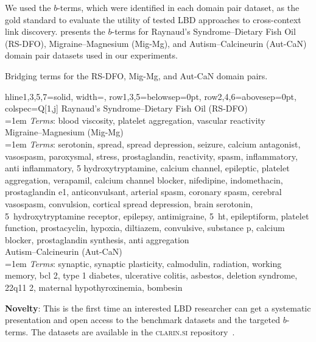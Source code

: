 \documentclass[runningheads]{llncs}
\begin{document}
We used the $b$-terms, which were identified in each domain pair dataset, as the gold standard to evaluate the utility of tested LBD approaches to cross-context link discovery.  presents the $b$-terms for Raynaud's Syndrome--Dietary Fish Oil (RS-DFO), Migraine--Magnesium (Mig-Mg), and Autism--Calcineurin (Aut-CaN) domain pair datasets used in our experiments.

\begin{table}[htb]
\centering
\caption{Bridging terms for the RS-DFO, Mig-Mg, and Aut-CaN domain pairs.}
\begin{tblr}{%
hline{1,3,5,7}={solid},%
width=\linewidth,%
row{1,3,5}={belowsep=0pt},
row{2,4,6}={abovesep=0pt},
colspec={Q[1,j]}%
}
Raynaud's Syndrome--Dietary Fish Oil (RS-DFO) \\
\leftskip=1em%
\textit{Terms}: blood viscosity, platelet aggregation, vascular reactivity \\
Migraine--Magnesium (Mig-Mg) \\
\leftskip=1em%
\textit{Terms}: serotonin, spread, spread depression, seizure, calcium antagonist, vasospasm,
paroxysmal, stress, prostaglandin, reactivity, spasm, inflammatory, anti inflammatory,
5 hydroxytryptamine, calcium channel, epileptic, platelet aggregation, verapamil,
calcium channel blocker, nifedipine, indomethacin, prostaglandin e1, anticonvulsant,
arterial spasm, coronary spasm, cerebral vasospasm, convulsion, cortical spread depression, brain serotonin, \hbox{5 hydroxytryptamine} receptor, epilepsy, antimigraine,
\hbox{5 ht}, epileptiform, platelet function, prostacyclin, hypoxia, diltiazem, convulsive,
substance p, calcium blocker, prostaglandin synthesis, anti aggregation \\
Autism--Calcineurin (Aut-CaN) \\
\leftskip=1em%
\textit{Terms}: synaptic, synaptic plasticity, calmodulin, radiation, working memory, bcl 2,
type 1 diabetes, ulcerative colitis, asbestos, deletion syndrome, 22q11 2,
maternal hypothyroxinemia, bombesin \\
\end{tblr}
\label{tab:b_terms}
\end{table}

\begin{tcolorbox}[breakable,notitle,sharp corners,boxrule=0.5pt,boxsep=0pt,left=5pt,right=5pt,top=5pt,bottom=5pt]
\textbf{Novelty}: This is the first time an interested LBD researcher can get a systematic presentation and open access to the benchmark datasets and the targeted $b$-terms. The datasets are available in the \textsc{clarin.si} repository~\cite{kastrin2024clarin}.
\end{tcolorbox}
\end{document}
